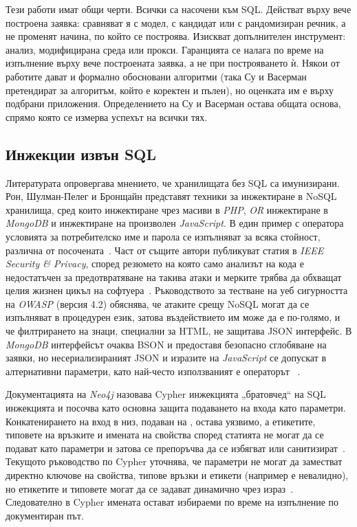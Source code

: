 Тези работи имат общи черти. Всички са насочени към SQL. Действат върху вече
построена заявка: сравняват я с модел, с кандидат или с рандомизиран речник, а не
променят начина, по който се построява. Изискват допълнителен инструмент: анализ,
модифицирана среда или прокси. Гаранцията се налага по време на изпълнение върху вече
построената заявка, а не при построяването ѝ. Някои от работите дават и формално
обосновани алгоритми (така Су и Васерман претендират за алгоритъм, който е коректен и
пълен), но оценката им е върху подбрани приложения. Определението на Су и Васерман
остава общата основа, спрямо която се измерва успехът на всички тях.

\subsection{Инжекции извън SQL}
\label{sec:existing-nosql}

Литературата опровергава мнението, че хранилищата без SQL са имунизирани. Рон,
Шулман-Пелег и Бронщайн представят техники за инжектиране в NoSQL хранилища, сред
които инжектиране чрез масиви в \textit{PHP}, \textit{OR} инжектиране в
\textit{MongoDB} и инжектиране на произволен \textit{JavaScript}. В един пример с
оператора  условията за потребителско име и парола се изпълняват за всяка
стойност, различна от посочената~\cite{ron2015nosql}. Част от същите автори публикуват
статия в \textit{IEEE Security \& Privacy}, според резюмето на която само анализът на
кода е недостатъчен за предотвратяване на такива атаки и мерките трябва да обхващат
целия жизнен цикъл на софтуера~\cite{ron2016nosql}. Ръководството за тестване на уеб сигурността на
\textit{OWASP} (версия 4.2) обяснява, че атаките срещу NoSQL могат да се изпълняват в
процедурен език, затова въздействието им може да е по-голямо, и че филтрирането на
знаци, специални за HTML, не защитава JSON интерфейс. В \textit{MongoDB} интерфейсът
очаква BSON и предоставя безопасно сглобяване на заявки, но несериализираният JSON и
изразите на \textit{JavaScript} се допускат в алтернативни параметри, като най-често
използваният е операторът ~\cite{owasp_wstg42_nosql}.

Документацията на \textit{Neo4j} назовава Cypher инжекцията „братовчед“ на SQL
инжекцията и посочва като основна защита подаването на входа като параметри.
Конкатенирането на вход в низ, подаван на , остава уязвимо,
а етикетите, типовете на връзките и имената на свойства според статията не могат да
се подават като параметри и затова се препоръчва да се избягват или санитизират~\cite{neo4j_cypher_injection_kb}.
Текущото ръководство по Cypher уточнява, че параметри не могат да заместват директно
ключове на свойства, типове връзки и етикети (например  е невалидно),
но етикетите и типовете могат да се задават динамично чрез израз~\cite{neo4j_cypher_parameters}.
Следователно в Cypher имената остават избираеми по време на изпълнение по документиран
път.

